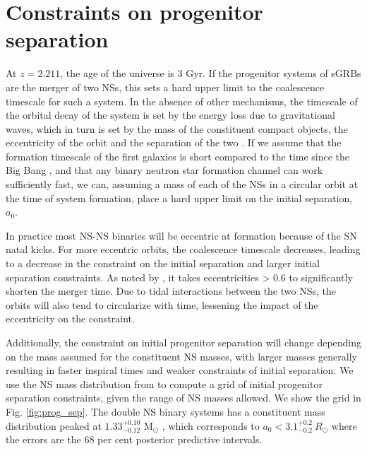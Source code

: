 \documentclass{aa}    %
\begin{document}
\section{Constraints on progenitor separation}

At $z = 2.211$, the age of the universe is 3 Gyr. If the progenitor systems of
sGRBs are the merger of two NSs, this sets a hard upper limit to the coalescence
timescale for such a system. In the absence of other mechanisms, the timescale
of the orbital decay of the system is set by the energy loss due to
gravitational waves, which in turn is set by the mass of the constituent compact
objects, the eccentricity of the orbit and the separation of the two
\citep{Postnov2014}. If we assume that the formation timescale of the first
galaxies is short compared to the time since the Big Bang \citep{Richard2011},
and that any binary neutron star formation channel can work sufficiently fast,
we can, assuming a mass of each of the NSs in a circular orbit at the time of
system formation, place a hard upper limit on the initial separation, $a_0$.

In practice most NS-NS binaries will be eccentric at formation because of the SN
natal kicks. For more eccentric orbits, the coalescence timescale decreases,
leading to a decrease in the constraint on the initial separation and larger
initial separation constraints. As noted by \citet{Postnov2014}, it takes
eccentricities > 0.6 to significantly shorten the merger time. Due to tidal
interactions between the two NSs, the orbits will also tend to circularize with
time, lessening the impact of the eccentricity on the constraint. 

Additionally, the constraint on initial progenitor separation will change
depending on the mass assumed for the constituent NS masses, with larger masses
generally resulting in faster inspiral times and weaker constraints of initial
separation. We use the NS mass distribution from \citet{Kiziltan2013} to compute
a grid of initial progenitor separation constraints, given the range of NS
masses allowed. We show the grid in Fig. \ref{fig:prog_sep}. The double NS
binary systems has a constituent mass distribution peaked at
$1.33^{+0.10}_{-0.12}$ M$_\odot$ \citep{Kiziltan2013}, which corresponds to  $a_0 <
3.1^{+0.2}_{-0.2}~R_\odot$ where the errors are the 68 per cent posterior
predictive intervals.
\end{document}
